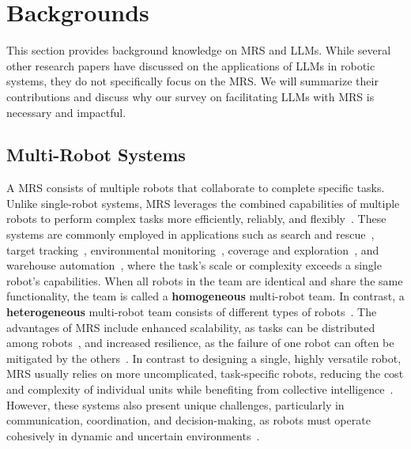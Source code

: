 \section{Backgrounds}\label{sec:2-back}
This section provides background knowledge on MRS and LLMs. While several other research papers have discussed on the applications of LLMs in robotic systems, they do not specifically focus on the MRS. We will summarize their contributions and discuss why our survey on facilitating LLMs with MRS is necessary and impactful.

\subsection{Multi-Robot Systems}

A MRS consists of multiple robots that collaborate to complete specific tasks. Unlike single-robot systems, MRS leverages the combined capabilities of multiple robots to perform complex tasks more efficiently, reliably, and flexibly~\cite{alonso2016distributed, rizk2019cooperative,zhou2021multi}. These systems are commonly employed in applications such as search and rescue~\cite{baxter2007multi,luo2011multi,kumar2012opportunities,queralta2020collaborative}, target tracking~\cite{zhou2018active,zhou2019sensor,zahroof2023multi,li2023assignment,liu2024multi}, environmental monitoring~\cite{schwager2011eyes, grocholsky2006cooperative}, coverage and exploration~\cite{burgard2005coordinated,shi2021communication,sharma2023d2coplan,liu2023active,cai2024energy}, and warehouse automation~\cite{alonso2015local, wurman2008coordinating}, where the task's scale or complexity exceeds a single robot's capabilities. When all robots in the team are identical and share the same functionality, the team is called a \textbf{homogeneous} multi-robot team. In contrast, a \textbf{heterogeneous} multi-robot team consists of different types of robots~\cite{parker2008handbook,sharma2020risk,cai2024energy}.
The advantages of MRS include enhanced scalability, as tasks can be distributed among robots~\cite{liu2022decentralized,zhou2022graph,chen2024learning}, and increased resilience, as the failure of one robot can often be mitigated by the others~\cite{zhou2018resilient,zhou2018approximation,ramachandran2020resilient,liu2021distributed,mayya2022adaptive,zhou2022risk,zhou2022distributed,zhou2023robust,shi2023robust,li2024resilient}. In contrast to designing a single, highly versatile robot, MRS usually relies on more uncomplicated, task-specific robots, reducing the cost and complexity of individual units while benefiting from collective intelligence~\cite{jones2004principled}. However, these systems also present unique challenges, particularly in communication, coordination, and decision-making, as robots must operate cohesively in dynamic and uncertain environments~\cite{queralta2020collaborative}. 
